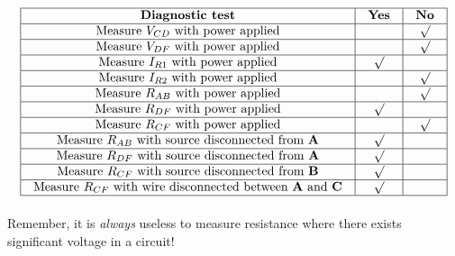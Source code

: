 \vfil 

\eject







$$\vbox{\offinterlineskip
\halign{\strut
\vrule \quad\hfil # \ \hfil & 
\vrule \quad\hfil # \ \hfil & 
\vrule \quad\hfil # \ \hfil \vrule \cr
\noalign{\hrule}
%
{\bf Diagnostic test} & {\bf Yes} & {\bf No} \cr
%
\noalign{\hrule}
%
Measure $V_{CD}$ with power applied &  & $\surd$ \cr
%
\noalign{\hrule}
%
Measure $V_{DF}$ with power applied &  & $\surd$ \cr
%
\noalign{\hrule}
%
Measure $I_{R1}$ with power applied & $\surd$ &  \cr
%
\noalign{\hrule}
%
Measure $I_{R2}$ with power applied &  & $\surd$ \cr
%
\noalign{\hrule}
%
Measure $R_{AB}$ with power applied &  & $\surd$ \cr
%
\noalign{\hrule}
%
Measure $R_{DF}$ with power applied & $\surd$ &  \cr
%
\noalign{\hrule}
%
Measure $R_{CF}$ with power applied &  & $\surd$ \cr
%
\noalign{\hrule}
%
Measure $R_{AB}$ with source disconnected from {\bf A} & $\surd$ &  \cr
%
\noalign{\hrule}
%
Measure $R_{DF}$ with source disconnected from {\bf A} & $\surd$ &  \cr
%
\noalign{\hrule}
%
Measure $R_{CF}$ with source disconnected from {\bf B} & $\surd$ &  \cr
%
\noalign{\hrule}
%
Measure $R_{CF}$ with wire disconnected between {\bf A} and {\bf C} & $\surd$ &  \cr
%
\noalign{\hrule}
} %
}$$ %

Remember, it is {\it always} useless to measure resistance where there exists significant voltage in a circuit!











